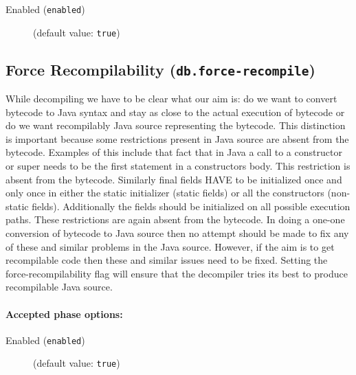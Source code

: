 \documentclass{article}
\begin{document}
\begin{description}

\item[Enabled ({\tt enabled})]
(default value: {\tt true})






\end{description}

\subsection{Force Recompilability ({\tt db.force-recompile})}
While decompiling we have to be clear what our aim is: do we want to convert bytecode
to Java syntax and stay as close to the actual execution of bytecode or do we want recompilably Java source representing
the bytecode. This distinction is important because some restrictions present in Java source are absent from the bytecode.
Examples of this include that fact that in Java a call to a constructor or super needs to be the first statement in
a constructors body. This restriction is absent from the bytecode. Similarly final fields HAVE to be initialized
once and only once in either the static initializer (static fields) or all the constructors (non-static fields). Additionally
the fields should be initialized on all possible execution paths. These restrictions are again absent from the bytecode.
In doing a one-one conversion of bytecode to Java source then no attempt should be made to fix any of these and similar problems
in the Java source. However, if the aim is to get recompilable code then these and similar issues need to be fixed. 
Setting the force-recompilability flag will ensure that the decompiler tries its best to produce recompilable Java source.

\paragraph{Accepted phase options:} 

\begin{description}

\item[Enabled ({\tt enabled})]
(default value: {\tt true})






\end{description}
\end{document}
